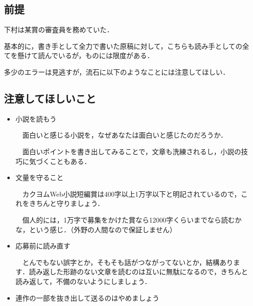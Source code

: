 \documentclass[10pt, a5paper, twoside]{jsarticle}
\theoremstyle{definition}
\begin{document}
		\subsection{前提}

			下村は某賞の審査員を務めていた．

			基本的に，書き手として全力で書いた原稿に対して，こちらも読み手としての全てを懸けて読んでいるが，ものには限度がある．

			多少のエラーは見逃すが，流石に以下のようなことには注意してほしい．

		\subsection{注意してほしいこと}

			\begin{itemize}

				\item 小説を読もう

				\vspace{1mm}

				　面白いと感じる小説を，なぜあなたは面白いと感じたのだろうか．

				　面白いポイントを書き出してみることで，文章も洗練されるし，小説の技巧に気づくこともある．

				\vspace{2mm}

				\item 文量を守ること

				\vspace{1mm}

				　カクヨムWeb小説短編賞は400字以上1万字以下と明記されているので，これをきちんと守りましょう．

				　個人的には，1万字で募集をかけた賞なら12000字くらいまでなら読むかな，という感じ．（外野の人間なので保証しません）

				\vspace{2mm}

				\item 応募前に読み直す

				\vspace{1mm}

				　とんでもない誤字とか，そもそも話がつながってないとか，結構あります．読み返した形跡のない文章を読むのは互いに無駄になるので，きちんと読み返して，不備のないようにしましょう．

				\vspace{2mm}

				\item 連作の一部を抜き出して送るのはやめましょう


\end{itemize}
\end{document}
